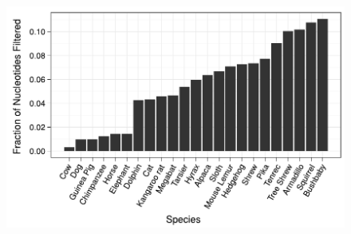 
\begin{figure}
\centering
\includegraphics[scale=0.9]{Figs/qual_filter_hist.pdf}
\caption{}
\label{filtered_qual_bars}
\end{figure}

